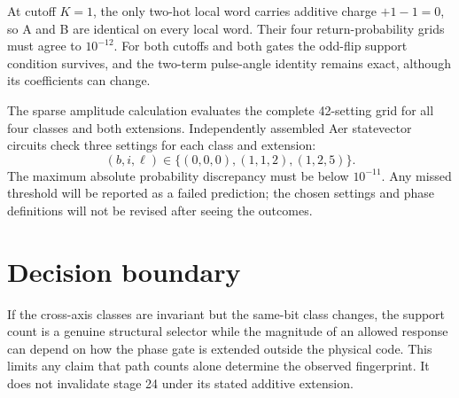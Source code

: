 \documentclass[10pt,a4paper]{article}
\begin{document}
At cutoff $K=1$, the only two-hot local word carries additive charge $+1-1=0$, so A and B are identical on every local word. Their four return-probability grids must agree to $10^{-12}$. For both cutoffs and both gates the odd-flip support condition survives, and the two-term pulse-angle identity remains exact, although its coefficients can change.

The sparse amplitude calculation evaluates the complete 42-setting grid for all four classes and both extensions. Independently assembled Aer statevector circuits check three settings for each class and extension:
\[
(b,i,\ell)\in\{(0,0,0),(1,1,2),(1,2,5)\}.
\]
The maximum absolute probability discrepancy must be below $10^{-11}$. Any missed threshold will be reported as a failed prediction; the chosen settings and phase definitions will not be revised after seeing the outcomes.

\section*{Decision boundary}
If the cross-axis classes are invariant but the same-bit class changes, the support count is a genuine structural selector while the magnitude of an allowed response can depend on how the phase gate is extended outside the physical code. This limits any claim that path counts alone determine the observed fingerprint. It does not invalidate stage 24 under its stated additive extension.
\end{document}
